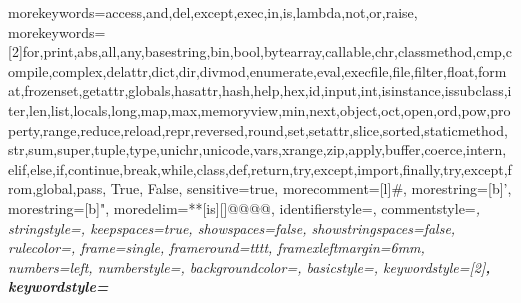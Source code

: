\usepackage{xcolor}

\usepackage{hyperref}
\hypersetup{
	breaklinks=true,  %
	colorlinks=true,
	urlcolor=rahmen,
	linkcolor=rahmen,
	citecolor=rahmen,
}
\hypersetup{linkcolor=rahmen}

\providecommand{\tightlist}{\setlength{\itemsep}{0pt}\setlength{\parskip}{0pt}}

\usepackage{subfig} %

\usepackage{cprotect}
 {
	morekeywords={access,and,del,except,exec,in,is,lambda,not,or,raise},
	morekeywords=[2]{for,print,abs,all,any,basestring,bin,bool,bytearray,callable,chr,classmethod,cmp,compile,complex,delattr,dict,dir,divmod,enumerate,eval,execfile,file,filter,float,format,frozenset,getattr,globals,hasattr,hash,help,hex,id,input,int,isinstance,issubclass,iter,len,list,locals,long,map,max,memoryview,min,next,object,oct,open,ord,pow,property,range,reduce,reload,repr,reversed,round,set,setattr,slice,sorted,staticmethod,str,sum,super,tuple,type,unichr,unicode,vars,xrange,zip,apply,buffer,coerce,intern,elif,else,if,continue,break,while,class,def,return,try,except,import,finally,try,except,from,global,pass, True, False},
	sensitive=true,
	morecomment=[l]\#,%
	morestring=[b]',%
	morestring=[b]",%
	moredelim=**[is][\color{black}]{@@}{@@},
	identifierstyle=\color{black}\footnotesize\ttfamily,
    commentstyle=\color{ipython-cyan}\footnotesize\itshape\ttfamily,
	stringstyle=\color{ipython-red}\footnotesize\ttfamily,
	keepspaces=true,
	showspaces=false,
    showstringspaces=false,
	rulecolor=\color{ipython-frame},
	frame=single,
	frameround={t}{t}{t}{t},
	framexleftmargin=6mm,
	numbers=left,
	numberstyle=\color{ipython-cyan},
	backgroundcolor=\color{ipython-bg},
	basicstyle=\footnotesize\ttfamily,
	keywordstyle=[2]\color{ipython-green}\bfseries\footnotesize\ttfamily, 
	keywordstyle=\color{ipython-purple}\bfseries\footnotesize\ttfamily
}

